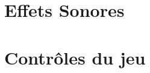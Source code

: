 \documentclass[a4paper]{article}
\begin{document}

  \newpage
  \part{Effets Sonores}
  


  \newpage
  \part{Contrôles du jeu}
  
  
\end{document}
